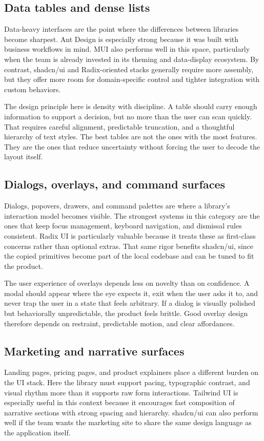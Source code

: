 \documentclass[11pt,twoside,a4paper]{article}
\begin{document}
\subsection{Data tables and dense lists}
Data-heavy interfaces are the point where the differences between libraries become sharpest. Ant Design is especially strong because it was built with business workflows in mind. MUI also performs well in this space, particularly when the team is already invested in its theming and data-display ecosystem. By contrast, shadcn/ui and Radix-oriented stacks generally require more assembly, but they offer more room for domain-specific control and tighter integration with custom behaviors.

The design principle here is density with discipline. A table should carry enough information to support a decision, but no more than the user can scan quickly. That requires careful alignment, predictable truncation, and a thoughtful hierarchy of text styles. The best tables are not the ones with the most features. They are the ones that reduce uncertainty without forcing the user to decode the layout itself.

\subsection{Dialogs, overlays, and command surfaces}
Dialogs, popovers, drawers, and command palettes are where a library's interaction model becomes visible. The strongest systems in this category are the ones that keep focus management, keyboard navigation, and dismissal rules consistent. Radix UI is particularly valuable because it treats these as first-class concerns rather than optional extras. That same rigor benefits shadcn/ui, since the copied primitives become part of the local codebase and can be tuned to fit the product.

The user experience of overlays depends less on novelty than on confidence. A modal should appear where the eye expects it, exit when the user asks it to, and never trap the user in a state that feels arbitrary. If a dialog is visually polished but behaviorally unpredictable, the product feels brittle. Good overlay design therefore depends on restraint, predictable motion, and clear affordances.

\subsection{Marketing and narrative surfaces}
Landing pages, pricing pages, and product explainers place a different burden on the UI stack. Here the library must support pacing, typographic contrast, and visual rhythm more than it supports raw form interactions. Tailwind UI is especially useful in this context because it encourages fast composition of narrative sections with strong spacing and hierarchy. shadcn/ui can also perform well if the team wants the marketing site to share the same design language as the application itself.
\end{document}
